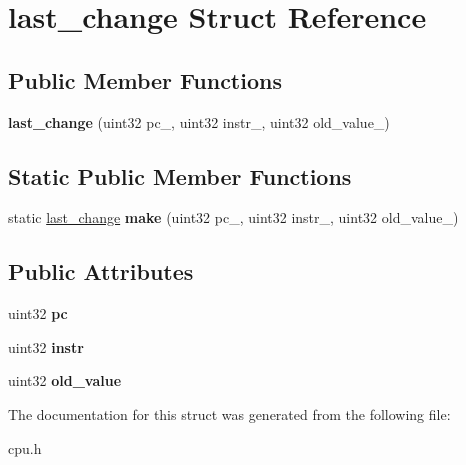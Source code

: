 \hypertarget{structlast__change}{
\section{last\_\-change Struct Reference}
\label{structlast__change}
}
\subsection*{Public Member Functions}
\begin{DoxyCompactItemize}
\item 
\hypertarget{structlast__change_a43a6801c6ef3c378c274a3c310d80a33}{
{\bfseries last\_\-change} (uint32 pc\_\-, uint32 instr\_\-, uint32 old\_\-value\_\-)}
\label{structlast__change_a43a6801c6ef3c378c274a3c310d80a33}

\end{DoxyCompactItemize}
\subsection*{Static Public Member Functions}
\begin{DoxyCompactItemize}
\item 
\hypertarget{structlast__change_a8371a85941a88825f636d36a56a22d28}{
static \hyperlink{structlast__change}{last\_\-change} {\bfseries make} (uint32 pc\_\-, uint32 instr\_\-, uint32 old\_\-value\_\-)}
\label{structlast__change_a8371a85941a88825f636d36a56a22d28}

\end{DoxyCompactItemize}
\subsection*{Public Attributes}
\begin{DoxyCompactItemize}
\item 
\hypertarget{structlast__change_abfd79bca221e524bc0b231e0fadcef16}{
uint32 {\bfseries pc}}
\label{structlast__change_abfd79bca221e524bc0b231e0fadcef16}

\item 
\hypertarget{structlast__change_a7e56a184561e0f3b18732d3f559ce14d}{
uint32 {\bfseries instr}}
\label{structlast__change_a7e56a184561e0f3b18732d3f559ce14d}

\item 
\hypertarget{structlast__change_aeb39258427782c5df01510ff10a0b328}{
uint32 {\bfseries old\_\-value}}
\label{structlast__change_aeb39258427782c5df01510ff10a0b328}

\end{DoxyCompactItemize}


The documentation for this struct was generated from the following file:\begin{DoxyCompactItemize}
\item 
cpu.h\end{DoxyCompactItemize}
